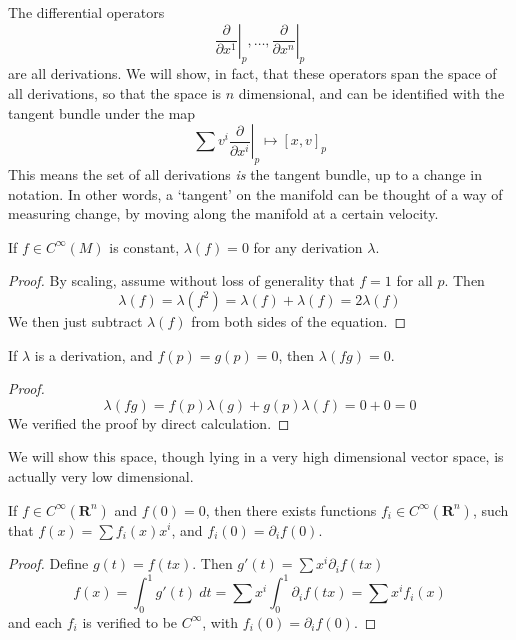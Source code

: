 The differential operators
%
\[ \left. \frac{\partial}{\partial x^1} \right|_p, \dots, \left. \frac{\partial}{\partial x^n}\right|_p \]
%
are all derivations. We will show, in fact, that these operators span the space of all derivations, so that the space is $n$ dimensional, and can be identified with the tangent bundle under the map
%
\[ \left. \sum v^i \frac{\partial}{\partial x^i} \right|_p \mapsto [x,v]_p \]
%
This means the set of all derivations {\it is} the tangent bundle, up to a change in notation. In other words, a `tangent' on the manifold can be thought of a way of measuring change, by moving along the manifold at a certain velocity.

\begin{lemma}
    If $f \in C^\infty(M)$ is constant, $\lambda(f) = 0$ for any derivation $\lambda$.
\end{lemma}
\begin{proof}
    By scaling, assume without loss of generality that $f = 1$ for all $p$. Then
    \[ \lambda(f) = \lambda(f^2) = \lambda(f) + \lambda(f) = 2 \lambda(f) \]
    We then just subtract $\lambda(f)$ from both sides of the equation.
\end{proof}

\begin{lemma}
    If $\lambda$ is a derivation, and $f(p) = g(p) = 0$, then $\lambda(fg) = 0$.
\end{lemma}
\begin{proof}
    \[ \lambda(fg) = f(p) \lambda(g) + g(p) \lambda(f) = 0 + 0 = 0 \]
    We verified the proof by direct calculation.
\end{proof}

We will show this space, though lying in a very high dimensional vector space, is actually very low dimensional.

\begin{lemma}
    If $f \in C^\infty(\mathbf{R}^n)$ and $f(0) = 0$, then there exists functions $f_i \in C^\infty(\mathbf{R}^n)$, such that $f(x) = \sum f_i(x) x^i$, and $f_i(0) = \partial_i f(0)$.
\end{lemma}
\begin{proof}
    Define $g(t) = f(tx)$. Then $g'(t) = \sum x^i \partial_i f(tx)$
    \[ f(x) = \int_0^1 g'(t)\ dt = \sum x^i \int_0^1 \partial_i f(tx) = \sum x^i f_i(x) \]
    and each $f_i$ is verified to be $C^\infty$, with $f_i(0) = \partial_i f(0)$.
\end{proof}

